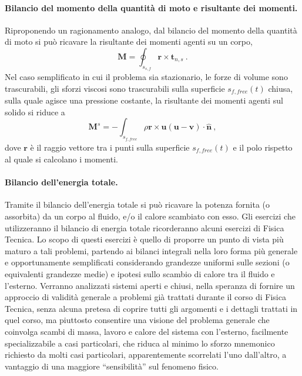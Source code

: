 \paragraph{Bilancio del momento della quantità di moto e risultante dei momenti.}
Riproponendo un ragionamento analogo, dal bilancio del momento della quantità di moto si può ricavare la risultante dei momenti agenti su un corpo,
\begin{equation}
 \bm{M} = \oint_{s_{s,f}} \bm{r} \times \bm{t}_{n,s} \ .
\end{equation}
 Nel caso semplificato in cui il problema sia stazionario, le forze di volume sono trascurabili, gli sforzi viscosi sono trascurabili sulla superficie $s_{f,free}(t)$ chiusa, sulla quale agisce una pressione costante, la risultante dei momenti agenti sul solido si riduce a
\begin{equation}
 \bm{M}^s = - \int_{s_{f,free}} \rho \bm{r} \times \bm{u} (\bm{u}-\bm{v}) \cdot \bm{\hat{n}} \ ,
\end{equation}
dove $\bm{r}$ è il raggio vettore tra i punti sulla superficie $s_{f,free}(t)$ e il polo rispetto al quale si calcolano i momenti.

\paragraph{Bilancio dell'energia totale.}
Tramite il bilancio dell'energia totale si può ricavare la potenza fornita (o assorbita) da un corpo al fluido, e/o il calore scambiato con esso. Gli esercizi che utilizzeranno il bilancio di energia totale ricorderanno alcuni esercizi di Fisica Tecnica. Lo scopo di questi esercizi è quello di proporre un punto di vista più maturo a tali problemi, partendo ai bilanci integrali nella loro forma più generale e opportunamente semplificati considerando grandezze uniformi sulle sezioni (o equivalenti grandezze medie) e ipotesi sullo scambio di calore tra il fluido e l'esterno. Verranno analizzati sistemi aperti e chiusi, nella speranza di fornire un approccio di validità generale a problemi già trattati durante il corso di Fisica Tecnica, senza alcuna pretesa di coprire tutti gli argomenti e i dettagli trattati in quel corso, ma piuttosto consentire una visione del problema generale che coinvolga scambi di massa, lavoro e calore del sistema con l'esterno, facilmente specializzabile a casi particolari, che riduca al minimo lo sforzo mnemonico richiesto da molti casi particolari, apparentemente scorrelati l'uno dall'altro, a vantaggio di una maggiore ``sensibilità'' sul fenomeno fisico.

